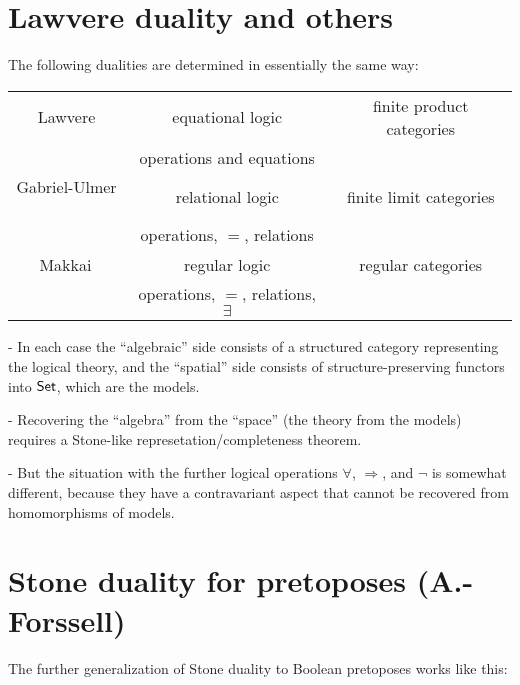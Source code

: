 \documentclass[lambek.tex]{subfiles}
\begin{document}
\section{Lawvere duality and others}

The following dualities are determined in essentially the same way:

\begin{center}
\begin{tabular}{c|c|c}
Lawvere & equational logic & finite product categories \\
& operations and equations & \\
\hline
Gabriel-Ulmer$^{\strut}$ & relational logic & finite limit categories \\
& operations, $=$, relations &  \\
\hline
Makkai$^{\strut}$ & regular logic & regular categories \\
& operations, $=$, relations, $\exists$ & \\
\end{tabular}
\end{center}


- In each case the ``algebraic'' side consists of a structured category representing the logical theory, and the ``spatial'' side consists of structure-preserving functors into $\mathsf{Set}$, which are the models.
\smallskip

- Recovering the ``algebra'' from the ``space'' (the theory from the models) requires a Stone-like represetation/completeness theorem.
\smallskip

- But the situation with the further logical operations $\forall$, $\Rightarrow$, and $\neg$ is somewhat different, because they have a contravariant aspect that cannot be recovered from homomorphisms of models.

\section{Stone duality for pretoposes (A.-Forssell)}

The further generalization of Stone duality to Boolean pretoposes works like this:
\medskip
\end{document}
